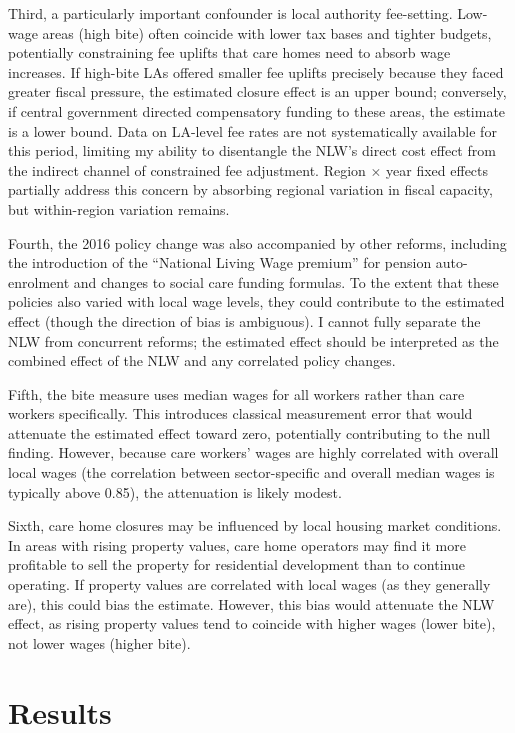\documentclass[12pt]{article}
\begin{document}
Third, a particularly important confounder is local authority fee-setting. Low-wage areas (high bite) often coincide with lower tax bases and tighter budgets, potentially constraining fee uplifts that care homes need to absorb wage increases. If high-bite LAs offered smaller fee uplifts precisely because they faced greater fiscal pressure, the estimated closure effect is an upper bound; conversely, if central government directed compensatory funding to these areas, the estimate is a lower bound. Data on LA-level fee rates are not systematically available for this period, limiting my ability to disentangle the NLW's direct cost effect from the indirect channel of constrained fee adjustment. Region $\times$ year fixed effects partially address this concern by absorbing regional variation in fiscal capacity, but within-region variation remains.

Fourth, the 2016 policy change was also accompanied by other reforms, including the introduction of the ``National Living Wage premium'' for pension auto-enrolment and changes to social care funding formulas. To the extent that these policies also varied with local wage levels, they could contribute to the estimated effect (though the direction of bias is ambiguous). I cannot fully separate the NLW from concurrent reforms; the estimated effect should be interpreted as the combined effect of the NLW and any correlated policy changes.

Fifth, the bite measure uses median wages for all workers rather than care workers specifically. This introduces classical measurement error that would attenuate the estimated effect toward zero, potentially contributing to the null finding. However, because care workers' wages are highly correlated with overall local wages (the correlation between sector-specific and overall median wages is typically above 0.85), the attenuation is likely modest.

Sixth, care home closures may be influenced by local housing market conditions. In areas with rising property values, care home operators may find it more profitable to sell the property for residential development than to continue operating. If property values are correlated with local wages (as they generally are), this could bias the estimate. However, this bias would attenuate the NLW effect, as rising property values tend to coincide with higher wages (lower bite), not lower wages (higher bite).


\section{Results}
\label{sec:results}
\end{document}
